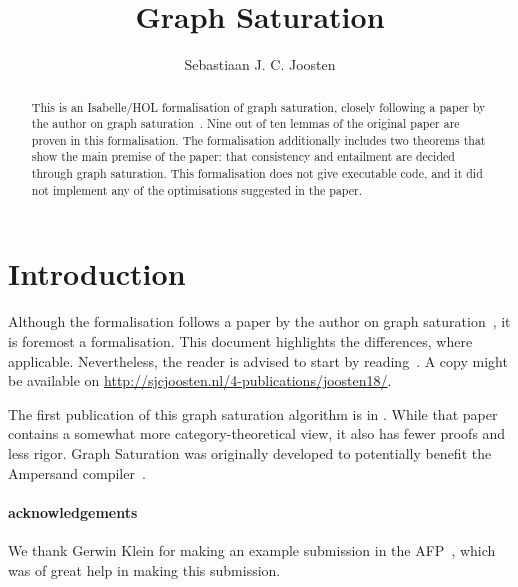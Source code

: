 \documentclass[11pt,a4paper]{article}
\begin{document}
\title{Graph Saturation}
\author{Sebastiaan J. C. Joosten}
\maketitle

\begin{abstract}
  This is an Isabelle/HOL formalisation of graph saturation, closely following a paper by the author on graph saturation~\cite{Joosten18}.
  Nine out of ten lemmas of the original paper are proven in this formalisation.
  The formalisation additionally includes two theorems that show the main premise of the paper: that consistency and entailment are decided through graph saturation.
  This formalisation does not give executable code, and it did not implement any of the optimisations suggested in the paper.
\end{abstract}

\tableofcontents

\section{Introduction}
Although the formalisation follows a paper by the author on graph saturation~\cite{Joosten18}, it is foremost a formalisation.
This document highlights the differences, where applicable.
Nevertheless, the reader is advised to start by reading~\cite{Joosten18}.
A copy might be available on \url{http://sjcjoosten.nl/4-publications/joosten18/}.

The first publication of this graph saturation algorithm is in \cite{Joosten17a}.
While that paper contains a somewhat more category-theoretical view,
it also has fewer proofs and less rigor.
Graph Saturation was originally developed to potentially benefit the Ampersand compiler~\cite{Michels11}.



\paragraph*{acknowledgements}
We thank Gerwin Klein for making an example submission in the AFP~\cite{Klein04}, which was of great help in making this submission.



\end{document}
